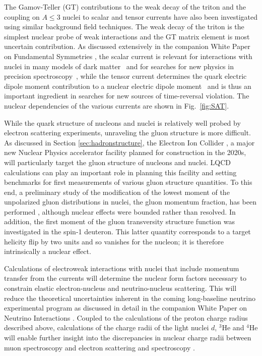 The Gamov-Teller (GT) contributions to the weak decay of the triton \cite{Savage:2016kon} and the coupling on $A\le3$ nuclei to scalar and tensor currents \cite{Chang:2017eiq} have also been investigated using similar background field techniques. The weak decay of the triton is the simplest nuclear probe of weak interactions and the GT matrix element is most uncertain contribution. 
As discussed extensively in the companion White Paper on Fundamental Symmetries \cite{wpfund}, the scalar current is relevant for interactions with nuclei in many models of dark matter~\cite{Undagoitia:2015gya} and for searches for new physics in precision spectroscopy~\cite{Delaunay:2016brc,Delaunay:2017dku}, while the tensor current determines 
the quark electric dipole moment contribution to a nuclear electric dipole moment~\cite{Engel:2013lsa,Yamanaka:2016umw,Chupp:2017rkp} and is thus an important ingredient in searches for new sources of time-reversal violation. 
 The nuclear dependencies of the various currents are shown in Fig.~\ref{fig:SAT}.


While the quark structure of nucleons and nuclei is relatively well probed by electron scattering experiments, unraveling the gluon structure is  more difficult. As discussed in Section \ref{sec:hadronstructure}, the Electron Ion Collider \cite{Accardi:2012qut}, a major new Nuclear Physics accelerator facility planned for construction in the 2020s, will particularly target the gluon structure of nucleons and nuclei. LQCD calculations can play an important role in planning this facility and setting benchmarks for first measurements of various gluon structure quantities. To this end, a preliminary study of the modification of the lowest moment of the unpolarized  gluon distributions in nuclei, the gluon momentum fraction, has been performed \cite{Winter:2017bfs}, although nuclear effects were bounded rather than resolved.   In addition, the first moment of the gluon transversity structure function was investigated in the spin-1 deuteron. This latter  quantity  corresponds to a target helicity flip by two units and so vanishes for the nucleon; it is therefore intrinsically a nuclear effect.



Calculations of electroweak interactions with nuclei that include momentum transfer from the currents will  determine the  nuclear form factors necessary to constrain  elastic electron-nucleus and  neutrino-nucleus scattering. This will reduce the theoretical uncertainties inherent in the coming long-baseline neutrino experimental program as discussed in detail in the companion White Paper on Neutrino Interactions \cite{wpneutrino}. Coupled to the calculations of the proton charge radius described above, calculations of the charge radii of the light nuclei $d$, $^3$He and $^4$He  will enable further insight into the discrepancies in nuclear charge radii between muon spectroscopy and electron scattering and spectroscopy \cite{Hill:2017wzi}.


